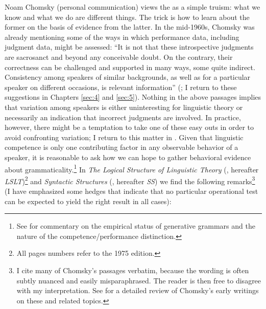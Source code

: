 Noam Chomsky (personal communication) views the  as a simple truism: what we know and what we do are different things. The trick is how to learn about the former on the basis of evidence from the latter. In the mid-1960s, Chomsky was already mentioning some of the ways in which performance data, including judgment data, might be assessed: ``It is not that these introspective judgments are sacrosanct and beyond any conceivable doubt. On the contrary, their correctness can be challenged and supported in many ways, some quite indirect. Consistency among speakers of similar backgrounds, as well as for a particular speaker on different occasions, is relevant information'' (\citet[56]{Chomsky1964}; I return to these suggestions in Chapters \ref{sec:4} and \ref{sec:5}). Nothing in the above passages implies that variation among speakers is either uninteresting for linguistic theory or necessarily an indication that incorrect judgments are involved. In practice, however, there might be a temptation to take one of these easy outs in order to avoid confronting variation; I return to this matter in . Given that linguistic competence is only one contributing factor in any observable behavior of a speaker, it is reasonable to ask how we can hope to gather behavioral evidence about grammaticality.\footnote{See  \citet{OllerEtAl1970} for commentary on the empirical status of generative grammars and the nature of the competence/performance distinction.}
 In \textit{The Logical Structure of Linguistic Theory} (\citet{Chomsky1975}, hereafter \textit{LSLT})\footnote{All pages numbers refer to the 1975 edition.} and \textit{Syntactic Structures}
(\citet{Chomsky1957}, hereafter \textit{SS}) we find the following remarks\footnote{I cite many of Chomsky's passages verbatim, because the wording is often subtly nuanced and easily misparaphrased. The reader is then free to disagree with my interpretation. See \citet[ch. 4]{Matthews1993} for a detailed review of Chomsky's early writings on these and related topics.
}
 (I have emphasized some hedges that indicate that no particular operational  test can be expected to yield the right result in all cases):

